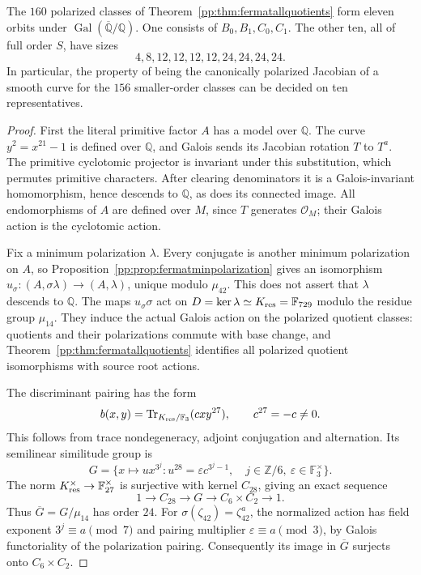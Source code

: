 \begin{theorem}
\label{pp:thm:quotientgalois}
The $160$ polarized classes of
Theorem~\ref{pp:thm:fermatallquotients} form eleven orbits under $\operatorname{Gal}(\overline{\mathbb Q}/\mathbb Q)$.
One consists of $B_0,B_1,C_0,C_1$. The other ten, all of full order $S$,
have sizes
\[
4,8,12,12,12,12,24,24,24,24.
\]
In particular, the property of being the canonically polarized Jacobian
of a smooth curve for the $156$
smaller-order classes can be decided on ten representatives.
\end{theorem}
\begin{proof}
First the literal primitive factor $A$ has a model over $\mathbb Q$.
The curve $y^2=x^{21}-1$ is defined over $\mathbb Q$, and Galois sends
its Jacobian rotation $T$ to $T^a$. The primitive cyclotomic projector
is invariant under this substitution, which permutes primitive
characters. After clearing denominators it is a Galois-invariant
homomorphism, hence descends to $\mathbb Q$, as does its connected
image. All endomorphisms of $A$ are defined over $M$, since $T$ generates
$\mathcal O_M$; their Galois action is the cyclotomic action.

Fix a minimum polarization $\lambda$. Every conjugate is another
minimum polarization on $A$, so
Proposition~\ref{pp:prop:fermatminpolarization} gives an isomorphism
$u_\sigma:(A,\sigma\lambda)\longrightarrow(A,\lambda)$, unique modulo
$\mu_{42}$. This does not assert that $\lambda$ descends to $\mathbb Q$.
The maps $u_\sigma\sigma$ act on
$D=\ker\lambda\simeq K_{\rm res}=\mathbb F_{729}$ modulo the residue group
$\mu_{14}$. They induce the actual Galois action on the polarized
quotient classes: quotients and their polarizations commute with base
change, and Theorem~\ref{pp:thm:fermatallquotients} identifies all
polarized quotient isomorphisms with source root actions.

The discriminant pairing has the form
\[
b(x,y)=\operatorname{Tr}_{K_{\rm res}/\mathbb F_3}(cxy^{27}),
\qquad c^{27}=-c\ne0.
\]
This follows from trace nondegeneracy, adjoint conjugation and
alternation. Its semilinear similitude group is
\[
G=\{x\mapsto ux^{3^j}:u^{28}=\varepsilon c^{3^j-1},\quad
               j\in\mathbb Z/6,\ \varepsilon\in\mathbb F_3^\times\}.
\]
The norm $K_{\rm res}^\times\to\mathbb F_{27}^\times$ is surjective with
kernel $C_{28}$, giving an exact sequence
\[
1\longrightarrow C_{28}\longrightarrow G
 \longrightarrow C_6\times C_2\longrightarrow1.
\]
Thus $\overline G=G/\mu_{14}$ has order $24$.
For $\sigma(\zeta_{42})=\zeta_{42}^a$, the normalized action has
field exponent $3^j\equiv a\pmod7$ and pairing multiplier
$\varepsilon\equiv a\pmod3$, by Galois functoriality of the
polarization pairing. Consequently its image in $\overline G$
surjects onto $C_6\times C_2$.


\end{proof}
